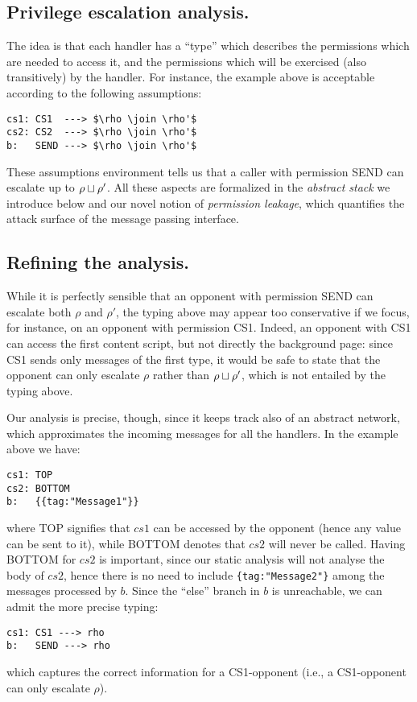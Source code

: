 \subsection{Privilege escalation analysis.}
The idea is that each handler has a ``type'' which describes the permissions which are needed to access it, and the permissions which will be exercised (also transitively) by the handler. For instance, the example above is acceptable according to the following assumptions:
\begin{small}
\begin{lstlisting}[mathescape]
cs1: CS1  ---> $\rho \join \rho'$
cs2: CS2  ---> $\rho \join \rho'$
b:   SEND ---> $\rho \join \rho'$
\end{lstlisting}
\end{small}
These assumptions environment tells us that a caller with permission SEND can escalate up to $\rho \sqcup \rho'$. All these aspects are formalized in the \emph{abstract stack} we introduce below and our novel notion of \emph{permission leakage}, which quantifies the attack surface of the message passing interface.

\subsection{Refining the analysis.}
While it is perfectly sensible that an opponent with permission SEND can escalate both $\rho$ and $\rho'$, the typing above may appear too conservative if we focus, for instance, on an opponent with permission CS1. Indeed, an opponent with CS1 can access the first content script, but not directly the background page: since CS1 sends only messages of the first type, it would be safe to state that the opponent can only escalate $\rho$ rather than $\rho \sqcup \rho'$, which is not entailed by the typing above.

Our analysis is precise, though, since it keeps track also of an abstract network, which approximates the incoming messages for all the handlers. In the example above we have:
\begin{verbatim}
cs1: TOP
cs2: BOTTOM
b:   {{tag:"Message1"}}
\end{verbatim}
where TOP signifies that $cs1$ can be accessed by the opponent (hence any value can be sent to it), while BOTTOM denotes that $cs2$ will never be called. Having BOTTOM for $cs2$ is important, since our static analysis will not analyse the body of $cs2$, hence there is no need to include \texttt{\{tag:"Message2"\}} among the messages processed by $b$. Since the ``else'' branch in $b$ is unreachable, we can admit the more precise typing:
\begin{verbatim}
cs1: CS1 ---> rho
b:   SEND ---> rho
\end{verbatim}
which captures the correct information for a CS1-opponent (i.e., a CS1-opponent can only escalate $\rho$).

